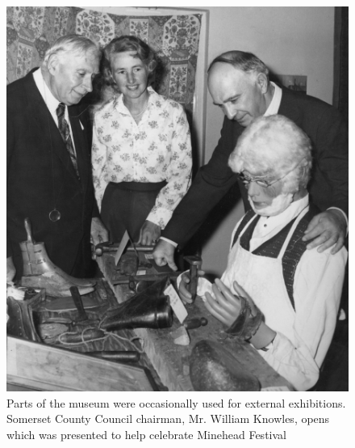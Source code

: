 \begin{figure}[]
     \includegraphics[width=1\textwidth]{figures/SomersetLife}
     \caption{Parts of the museum were occasionally used for external exhibitions. Somerset County Council chairman, Mr. William Knowles, opens  which was presented to help celebrate Minehead Festival}
     \label{fig:SomersetLife}
\end{figure}

